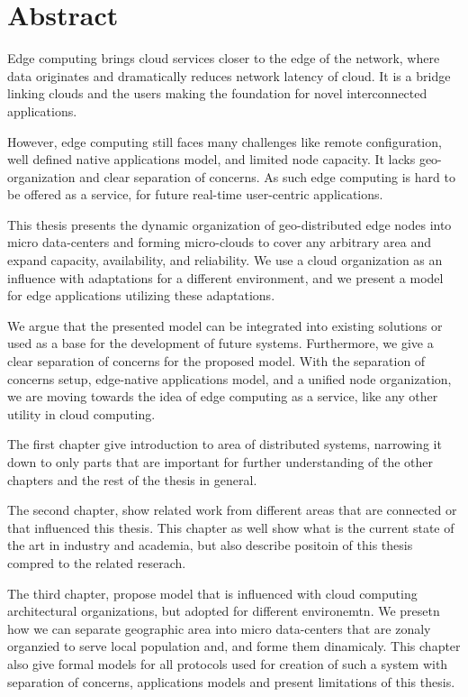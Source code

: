 \chapter*{Abstract}
Edge computing brings cloud services closer to the edge of the network, where data originates and dramatically reduces network latency of cloud. It is a bridge linking clouds and the users making the foundation for novel interconnected applications.

However, edge computing still faces many challenges like remote configuration, well defined native applications model, and limited node capacity. It lacks geo-organization and clear separation of concerns. As such edge computing is hard to be offered as a service, for future real-time user-centric applications. 

This thesis presents the dynamic organization of geo-distributed edge nodes into micro data-centers and forming micro-clouds to cover any arbitrary area and expand capacity, availability, and reliability. We use a cloud organization as an influence with adaptations for a different environment, and we present a model for edge applications utilizing these adaptations. 

We argue that the presented model can be integrated into existing solutions or used as a base for the development of future systems. Furthermore, we give a clear separation of concerns for the proposed model. With the separation of concerns setup, edge-native applications model, and a unified node organization, we are moving towards the idea of edge computing as a service, like any other utility in cloud computing. 

The first chapter give introduction to area of distributed systems, narrowing it down to only parts that are important for further understanding of the other chapters and the rest of the thesis in general.

The second chapter, show related work from different areas that are connected or that influenced this thesis. This chapter as well show what is the current state of the art in industry and academia, but also describe positoin of this thesis compred to the related reserach.

The third chapter, propose model that is influenced with cloud computing architectural organizations, but adopted for different environemtn. We presetn how we can separate geographic area into micro data-centers that are zonaly organzied to serve local population and, and forme them dinamicaly. This chapter also give formal models for all protocols used for creation of such a system with separation of concerns, applications models and present limitations of this thesis.

